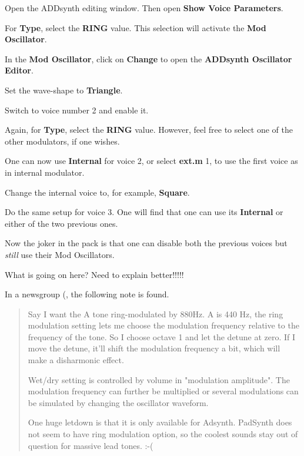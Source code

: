    \begin{enumber}
      \item Open the ADDsynth editing window.  Then open
         \textbf{Show Voice Parameters}.
      \item For \textbf{Type}, select the \textbf{RING} value.  This
         selection will activate the \textbf{Mod Oscillator}.
      \item In the \textbf{Mod Oscillator}, click on \textbf{Change} to open
         the \textbf{ADDsynth Oscillator Editor}.
      \item Set the wave-shape to \textbf{Triangle}.
      \item Switch to voice number 2 and enable it.
      \item Again, for \textbf{Type}, select the \textbf{RING} value.
         However, feel free to select one of the other modulators, if one
         wishes.
      \item One can now use \textbf{Internal} for voice 2, or select
         \textbf{ext.m} 1, to use the first voice as in internal modulator.
      \item Change the internal voice to, for example, \textbf{Square}.
      \item Do the same setup for voice 3.
         One will find that one can use its \textbf{Internal} or
         either of the two previous ones.
   \end{enumber}

   Now the joker in the pack is that one can disable both the previous
   voices but \textsl{still} use their Mod Oscillators.

   What is going on here?  Need to explain better!!!!!

   In a newsgroup (\cite{ringmodulator}, the following note is found.

   \begin{quotation}
      Say I want the A tone ring-modulated by 880Hz. A is 440 Hz, the ring
      modulation setting lets me choose the modulation frequency relative
      to the frequency of the tone. So I choose octave 1 and let the
      detune at zero. If I move the detune, it'll shift the modulation
      frequency a bit, which will make a disharmonic effect.

      Wet/dry setting is controlled by volume in "modulation amplitude".
      The modulation frequency can further be multiplied or several
      modulations can be simulated by changing the oscillator waveform.

      One huge letdown is that it is only available for Adsynth. PadSynth
      does not seem to have ring modulation option, so the coolest sounds
      stay out of question for massive lead tones. :-(
   \end{quotation}


